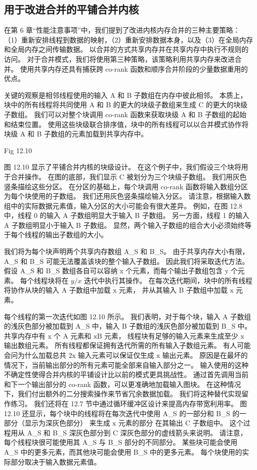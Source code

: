 \subsection{用于改进合并的平铺合并内核}
在第 6 章“性能注意事项”中，我们提到了改进内核内存合并的三种主要策略：
（1）重新安排线程到数据的映射，（2）重新安排数据本身，以及（3）在全局内存和全局内存之间传输数据。 
以合并的方式共享内存并在共享内存中执行不规则的访问。 对于合并模式，我们将使用第三种策略，该策略利用共享内存来改进合并。 
使用共享内存还具有捕获跨 co-rank 函数和顺序合并阶段的少量数据重用的优点。

关键的观察是相邻线程使用的输入 A 和 B 子数组在内存中彼此相邻。 
本质上，块中的所有线程将共同使用 A 和 B 的更大的块级子数组来生成 $\mathrm{C}$ 的更大的块级子数组。 
我们可以对整个块调用 co-rank 函数来获取块级 A 和 B 子数组的起始和结束位置。 
使用这些块级联合排序值，块中的所有线程可以以合并模式协作将块级 A 和 B 子数组的元素加载到共享内存中。

{\color{red} Fig 12.10}

图 12.10 显示了平铺合并内核的块级设计。 在这个例子中，我们假设三个块将用于合并操作。 
在图的底部，我们显示 $\mathrm{C}$ 被划分为三个块级子数组。 我们用灰色竖条描绘这些分区。 
在分区的基础上，每个块调用 co-rank 函数将输入数组分区为每个块使用的子数组。 我们还用灰色竖条描绘输入分区。 
请注意，根据输入数组中的实际数据元素值，输入分区的大小可能会有很大差异。 
例如，在图 12.8 中，线程 0 的输入 A 子数组明显大于输入 B 子数组。 
另一方面，线程 1 的输入 A 子数组明显小于输入 B 子数组。
显然，两个输入子数组的组合大小必须始终等于每个线程的输出子数组的大小。

我们将为每个块声明两个共享内存数组 A\_S 和 B\_S。 
由于共享内存大小有限，A\_S 和 B\_S 可能无法覆盖该块的整个输入子数组。 
因此我们将采取迭代方法。 假设 A\_S 和 B\_S 数组各自可以容纳 x 个元素，而每个输出子数组包含 y 个元素。 
每个线程块将在 $y / x$ 迭代中执行其操作。 
在每次迭代期间，块中的所有线程将协作从块的输入 A 子数组中加载 $\mathrm{x}$ 元素，
并从其输入 B 子数组中加载 $\mathrm{x}$ 元素。

每个线程的第一次迭代如图 12.10 所示。 
我们表明，对于每个块，输入 A 子数组的浅灰色部分被加载到 A\_S 中，输入 B 子数组的浅灰色部分被加载到 B\_S 中。 
共享内存中有 x 个 A 元素和 $\mathrm{x} \mathrm{B}$ 元素，
线程块有足够的输入元素来生成至少 $\mathrm{x}$ 输出数组元素。 
所有线程都保证拥有迭代所需的所有输入子数组元素。 
有人可能会问为什么加载总共 $2 \mathrm{x}$ 输入元素可以保证仅生成 $\mathrm{x}$ 输出元素。 
原因是在最坏的情况下，当前输出部分的所有元素可能全部来自输入部分之一。 
输入使用的这种不确定性使得合并内核的平铺设计比以前的模式更具挑战性。 
通过首先调用当前和下一个输出部分的 co-rank 函数，可以更准确地加载输入图块。 
在这种情况下，我们付出额外的二分搜索操作来节省冗余数据加载。 我们将这种替代实现留作练习。 
我们还将在 12.7 节中通过循环缓冲区设计来提高内存带宽利用率。 
图 12.10 还显示，每个块中的线程将在每次迭代中使用 A\_S 的一部分和 B\_S 的一部分（显示为深灰色部分）
来生成 $\mathrm{x}$ 元素的部分 在其输出 $\mathrm{C}$ 子数组中。 
这个过程用从 A\_S 和 B\_S 深灰色部分到 C 深灰色部分的虚线箭头来说明。 
请注意，每个线程块很可能使用其 A\_S 与 B\_S 部分的不同部分。 
某些块可能会使用 A\_S 中的更多元素，而其他块可能会使用 B\_S 中的更多元素。 每个块使用的实际部分取决于输入数据元素值。

